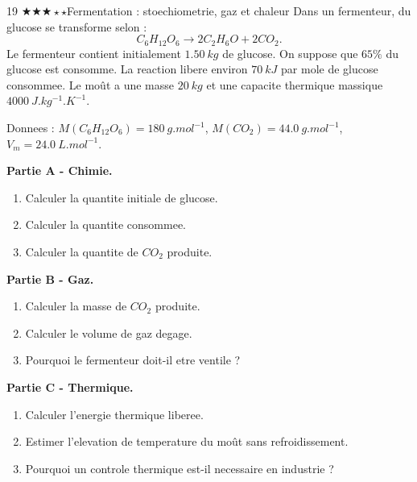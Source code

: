 \documentclass[11pt,a4paper]{article}
\newcommand{\diffthree}{\(\bigstar\bigstar\bigstar\star\star\)}
\begin{document}
\begin{probleme}{19 \diffthree}{Fermentation : stoechiometrie, gaz et chaleur}
Dans un fermenteur, du glucose se transforme selon :
\[
C_6H_{12}O_6\rightarrow2C_2H_6O+2CO_2.
\]
Le fermenteur contient initialement \(\SI{1.50}{kg}\) de glucose. On suppose que \(65\%\) du glucose est consomme. La reaction libere environ \(\SI{70}{kJ}\) par mole de glucose consommee. Le moût a une masse \(\SI{20}{kg}\) et une capacite thermique massique \(\SI{4000}{J.kg^{-1}.K^{-1}}\).

Donnees : \(M(C_6H_{12}O_6)=\SI{180}{g.mol^{-1}}\), \(M(CO_2)=\SI{44.0}{g.mol^{-1}}\), \(V_m=\SI{24.0}{L.mol^{-1}}\).

\textbf{Partie A - Chimie.}
\begin{enumerate}
\item Calculer la quantite initiale de glucose.
\item Calculer la quantite consommee.
\item Calculer la quantite de \(CO_2\) produite.
\end{enumerate}

\textbf{Partie B - Gaz.}
\begin{enumerate}[resume]
\item Calculer la masse de \(CO_2\) produite.
\item Calculer le volume de gaz degage.
\item Pourquoi le fermenteur doit-il etre ventile ?
\end{enumerate}

\textbf{Partie C - Thermique.}
\begin{enumerate}[resume]
\item Calculer l'energie thermique liberee.
\item Estimer l'elevation de temperature du moût sans refroidissement.
\item Pourquoi un controle thermique est-il necessaire en industrie ?
\end{enumerate}
\end{probleme}
\end{document}
